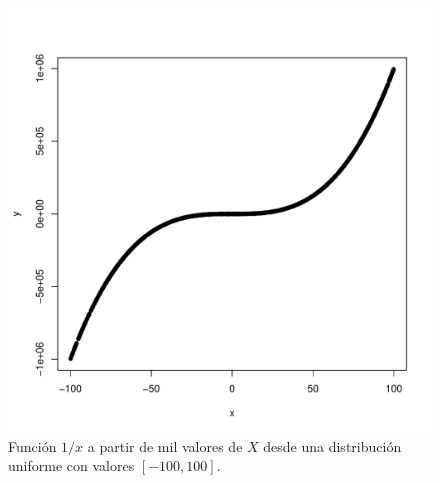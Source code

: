\documentclass[paper=leter, fontsize=11pt]{scrartcl}
\numberwithin{equation}{section}		%
\numberwithin{figure}{section}			%
\numberwithin{table}{section}				%
\begin{document}
\begin{figure}
    \centering
    \includegraphics[width=1\textwidth]{xTfunc3.pdf}
    \caption{Función $1 / x$ a partir de mil valores de $X$ desde una distribución uniforme con valores $[-100, 100]$.}
    \label{xTfunc3}
\end{figure}
\end{document}
